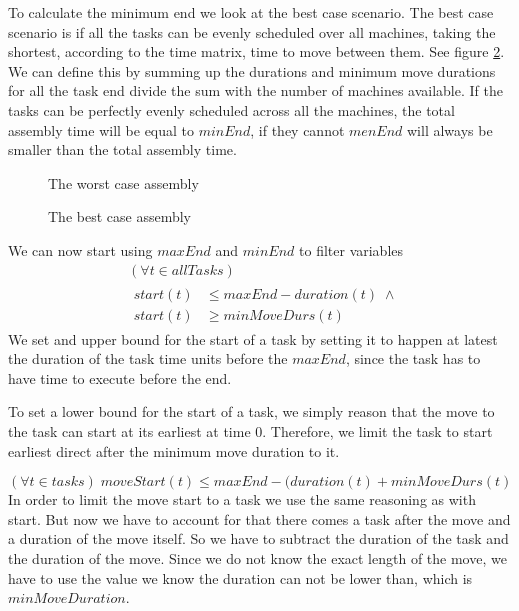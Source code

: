 To calculate the minimum end we look at the best case scenario. The best case scenario is if all the tasks can be evenly scheduled over all machines, taking the shortest, according to the time matrix, time to move between them. See figure \ref{fig:best_case}. We can define this by summing up the durations and minimum move durations for all the task end divide the sum with the number of machines available. If the tasks can be perfectly evenly scheduled across all the machines, the total assembly time will be equal to $minEnd$, if they cannot $menEnd$ will always be smaller than the total assembly time.

 \begin{figure}
 	\centering
 	
 	\caption{The worst case assembly}
 	\label{fig:worst_case}
 \end{figure}
  \begin{figure}
  	\centering
  	
  	\caption{The best case assembly}
  	\label{fig:best_case}
  \end{figure}
\newpage
We can now start using $maxEnd$ and $minEnd$ to filter variables
 \begin{equation}\label{eq:61}
 \begin{aligned}
&(\forall t \in allTasks)\\
&\begin{aligned}
start(t) &\le maxEnd-duration(t) \; \land\\
start(t) &\ge minMoveDurs(t)
\end{aligned}
 \end{aligned}
 \end{equation}
We set and upper bound for the start of a task by setting it to happen at latest the duration of the task time units before the $maxEnd$, since the task has to have time to execute before the end.

To set a lower bound for the start of a task, we simply reason that the move to the task can start at its earliest at time 0. Therefore, we limit the task to start earliest direct after the minimum move duration to it.

 \begin{equation}\label{eq:63}
 (\forall t \in tasks) \; moveStart(t) \le maxEnd-(duration(t)+minMoveDurs(t)\end{equation}
 In order to limit the move start to a task we use the same reasoning as with start. But now we have to account for that there comes a task after the move and a duration of the move itself. So we have to subtract the duration of the task and the duration of the move. Since we do not know the exact length of the move, we have to use the value we know the duration can not be lower than, which is $minMoveDuration$.
 
